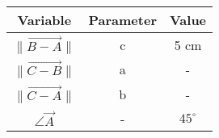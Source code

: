 \begin{center}
    \begin{tabular}{|c|c|c|} 
        \hline
            \textbf{Variable} & \textbf{Parameter} & \textbf{Value} \\ 
        \hline
            $\lVert \vec{B - A}\rVert$ & c & 5 cm \\ 
        \hline
             $\lVert \vec{C - B}\rVert$ & a & - \\ 
        \hline
             $\lVert \vec{C - A}\rVert$ & b &   -    \\
        \hline
            $\angle \vec{A}$  & -  & $45^\circ$ \\
        \hline
    \end{tabular}
\end{center}  
